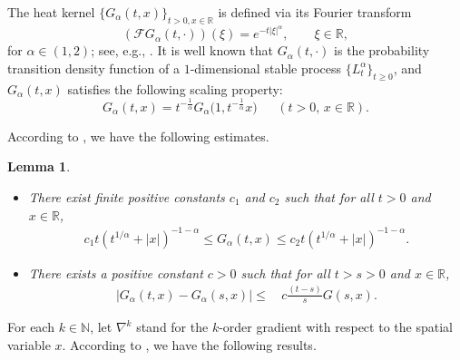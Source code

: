 \documentclass[11pt,reqno]{amsart}
\numberwithin{equation}{section}
\newtheorem{lemma}{Lemma}[section]
\newcommand{\1}{{\bf 1}}
\newcommand{\2}{{\bf 2}}
\begin{document}
The heat kernel $\{G_{\alpha}(t,  x)\}_{t>0,x\in \mathbb R}$ is defined via its Fourier transform
\begin{equation}
( \mathscr {F}G_{\alpha}(t,\cdot))(\xi)=e^{-t|\xi|^{\alpha}}, \qquad \xi\in\mathbb{R},
\end{equation}
for $\alpha\in(1,2)$; see,  e.g.,  \cite{BG1960, normalization, CZ2016}. It is well known that   $G_{\alpha}(t, \cdot)$ is the probability transition density function of a    $1$-dimensional    stable process $\{L_t^{\alpha}\}_{t\ge0}$, and   $G_{\alpha}(t, x)$ satisfies the following scaling property:
   \begin{equation}\label{eq scaling}
    G_{\alpha}(t, x)=t^{-\frac{1}{\alpha}} G_{\alpha}\big(1, t^{-\frac{1}{\alpha}}x\big) \ \ \ \  \ \ \ (t>0,\, x\in \mathbb R).
  \end{equation}
  
  According to \cite[Theorem 1.1]{CZ2016}, we have the following estimates.
     \begin{lemma}
  \begin{itemize}
  \item[(a)]  There exist   finite positive constants $c_{1}$ and $c_{2}$
 such that  for all $t>0$ and $x \in \mathbb R$,
\begin{align}\label{eq Green 3}
c_{1}t\left(t^{1/\alpha}+ |x| \right)^{-1-\alpha}\le G_{\alpha}(t, x)\le c_{2}t\left(t^{1/\alpha}+|x| \right)^{-1-\alpha}.
\end{align}
 

\item[(c)]   There exists a positive constant $c>0$ such that  for all $t>s>0$  and $x\in \mathbb R$,
 \begin{equation}\label{eq grad temp}
\begin{split}
 \left|G_{\alpha}(t, x) -G_{\alpha}(s, x) \right|
\le  &\,  c \frac{(t-s)}{s} G(s, x).
\end{split}
\end{equation}
  \end{itemize}
    \end{lemma}
  
 For each  $k\in \mathbb{N}$, let $\nabla^k $ stand for the $k$-order gradient with respect to the spatial variable $x$.  According to \cite[Lemma 2.2]{CZ2016}, we have the following results. 
      
\end{document}
